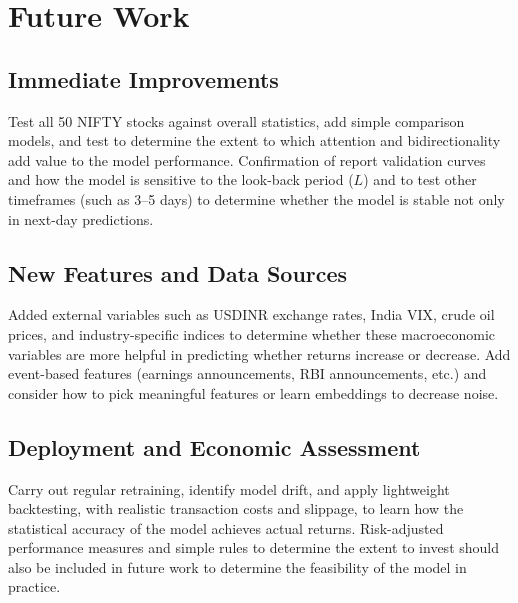 \documentclass[conference]{IEEEtran}
\begin{document}
\section{Future Work}

\subsection{Immediate Improvements}

Test all 50 NIFTY stocks against overall statistics, add simple comparison models, and test to determine the extent to which attention and bidirectionality add value to the model performance. Confirmation of report validation curves and how the model is sensitive to the look-back period ($L$) and to test other timeframes (such as 3--5 days) to determine whether the model is stable not only in next-day predictions.

\subsection{New Features and Data Sources}

Added external variables such as USDINR exchange rates, India VIX, crude oil prices, and industry-specific indices to determine whether these macroeconomic variables are more helpful in predicting whether returns increase or decrease. Add event-based features (earnings announcements, RBI announcements, etc.) and consider how to pick meaningful features or learn embeddings to decrease noise.

\subsection{Deployment and Economic Assessment}

Carry out regular retraining, identify model drift, and apply lightweight backtesting, with realistic transaction costs and slippage, to learn how the statistical accuracy of the model achieves actual returns. Risk-adjusted performance measures and simple rules to determine the extent to invest should also be included in future work to determine the feasibility of the model in practice.
\end{document}
